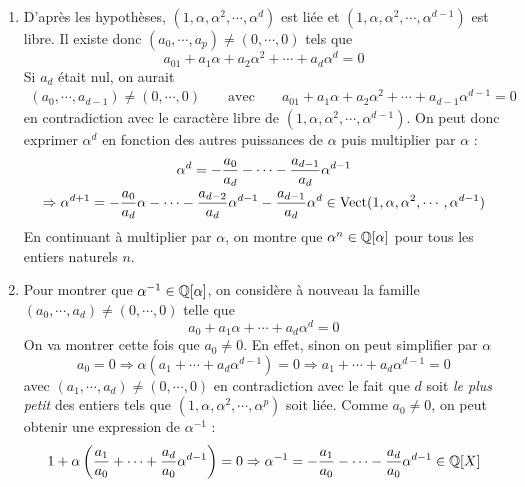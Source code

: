 \begin{enumerate}
\begin{enumerate}
\item D'après les hypothèses, $(1,\alpha,\alpha^2,\cdots,\alpha^d)$ est liée et $(1,\alpha,\alpha^2,\cdots,\alpha^{d-1})$ est libre. Il existe donc $(a_0,\cdots,a_p)\neq (0,\cdots,0)$ tels que
\begin{displaymath}
 a_01 + a_1\alpha + a_2\alpha^2 + \cdots + a_d\alpha^d =0
\end{displaymath}
Si $a_d$ était nul, on aurait
\begin{align*}
 (a_0,\cdots,a_{d-1})\neq (0,\cdots,0) & & \text{ avec } & & a_01 + a_1\alpha + a_2\alpha^2 + \cdots + a_{d-1}\alpha^{d-1} =0
\end{align*}
en contradiction avec le caractère libre de $(1,\alpha,\alpha^2,\cdots,\alpha^{d-1})$.\newline
On peut donc exprimer $\alpha^d$ en fonction des autres puissances de $\alpha$ puis multiplier par $\alpha$ :
\begin{multline*}
 \alpha^d = -\dfrac{a_0}{a_d}-\cdots -\dfrac{a_{d-1}}{a_d}\alpha^{d-1}\\
\Rightarrow
\alpha^{d+1} = -\dfrac{a_0}{a_d}\alpha -\cdots -\dfrac{a_{d-2}}{a_d}\alpha^{d-1} - \dfrac{a_{d-1}}{a_d}\alpha^{d}
\in \operatorname{Vect}(1,\alpha,\alpha^2,\cdots,\alpha^{d-1})
\end{multline*}
En continuant à multiplier par $\alpha$, on montre que $\alpha^n\in \mathbb{Q}[\alpha]$ pour tous les entiers naturels $n$.
\item Pour montrer que $\alpha^{-1}\in \mathbb{Q}[\alpha]$, on considère à nouveau la famille $(a_0,\cdots,a_d)\neq (0,\cdots,0)$ telle que
\begin{displaymath}
 a_0+a_1\alpha + \cdots + a_d\alpha^d=0
\end{displaymath}
On va montrer cette fois que $a_0\neq0$. En effet, sinon on peut simplifier par $\alpha$
\begin{displaymath}
 a_0=0 \Rightarrow \alpha\left(a_1 +\cdots +a_d\alpha^{d-1} \right) =0
\Rightarrow a_1 +\cdots +a_d\alpha^{d-1}=0
\end{displaymath}
avec $(a_1,\cdots,a_{d})\neq (0,\cdots,0)$ en contradiction avec le fait que $d$ soit \emph{le plus petit} des entiers tels que $(1,\alpha,\alpha^2,\cdots,\alpha^p)$ soit liée.\newline
Comme $a_0\neq 0$, on peut obtenir une expression de $\alpha^{-1}$ :
\begin{displaymath}
 1+\alpha\left(\dfrac{a_1}{a_0} + \cdots + \dfrac{a_d}{a_0}\alpha^{d-1} \right) =0
\Rightarrow \alpha^{-1}= -\dfrac{a_1}{a_0} - \cdots - \dfrac{a_d}{a_0}\alpha^{d-1} \in \mathbb{Q}[X]
\end{displaymath}


\end{enumerate}
\end{enumerate}
